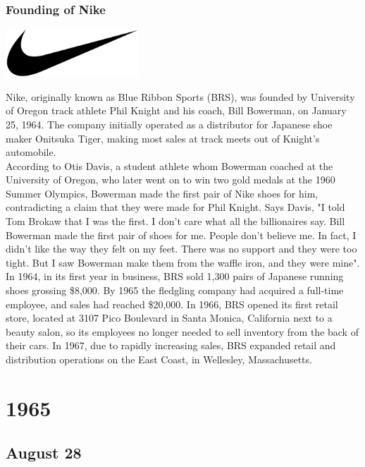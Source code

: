 \documentclass[11pt]{report}
\begin{document}
\subsection{Founding of Nike}
\vspace{2mm}\begin{center}\includegraphics[width=5cm]{./img/nikeLogo.jpg}\end{center}
Nike, originally known as Blue Ribbon Sports (BRS), was founded by University of Oregon track athlete Phil Knight and his coach, Bill Bowerman, on January 25, 1964. The company initially operated as a distributor for Japanese shoe maker Onitsuka Tiger, making most sales at track meets out of Knight's automobile.\\ \indent According to Otis Davis, a student athlete whom Bowerman coached at the University of Oregon, who later went on to win two gold medals at the 1960 Summer Olympics, Bowerman made the first pair of Nike shoes for him, contradicting a claim that they were made for Phil Knight. Says Davis, "I told Tom Brokaw that I was the first. I don't care what all the billionaires say. Bill Bowerman made the first pair of shoes for me. People don't believe me. In fact, I didn't like the way they felt on my feet. There was no support and they were too tight. But I saw Bowerman make them from the waffle iron, and they were mine".\\ \indent In 1964, in its first year in business, BRS sold 1,300 pairs of Japanese running shoes grossing \$8,000. By 1965 the fledgling company had acquired a full-time employee, and sales had reached \$20,000. In 1966, BRS opened its first retail store, located at 3107 Pico Boulevard in Santa Monica, California next to a beauty salon, so its employees no longer needed to sell inventory from the back of their cars. In 1967, due to rapidly increasing sales, BRS expanded retail and distribution operations on the East Coast, in Wellesley, Massachusetts.

\chapter{1965}
\section{August 28}
\end{document}
